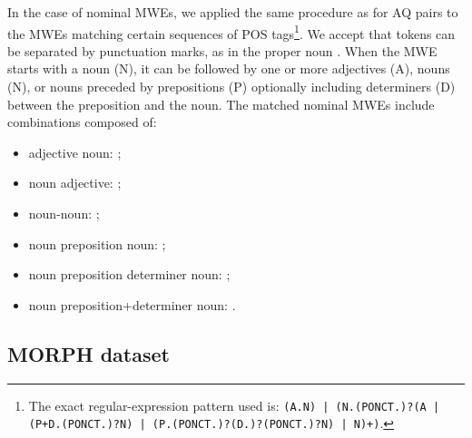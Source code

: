 \documentclass[output=paper,
modfonts
]{langscibook}
\begin{document}
In the case of nominal MWEs, we applied the same procedure as for AQ pairs to the MWEs matching certain sequences of POS tags\footnote{The exact regular-expression pattern used is: \texttt{(A.N) | (N.(PONCT.)?(A |(P+D.(PONCT.)?N) | (P.(PONCT.)?(D.)?(PONCT.)?N) | N)+)}.}. We accept that tokens can be separated by punctuation marks, as in the proper noun . When the MWE starts with a noun (N), it can be followed by one or more adjectives (A), nouns (N), or nouns preceded by prepositions (P) optionally including determiners (D) between the preposition and the noun.
The matched nominal MWEs include combinations composed of: 
\begin{itemize}
\item adjective noun: ;
\item noun adjective: ;
\item noun-noun: ;
\item noun preposition noun: ;
\item noun preposition determiner noun: ;
\item noun preposition+determiner noun: .
\end{itemize}



\subsection{MORPH dataset} %
\label{subsec:morph}
\end{document}
